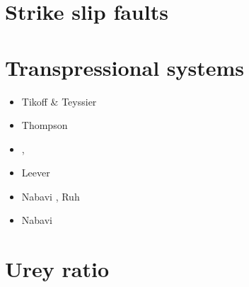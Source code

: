 \section{Strike slip faults} 


\textcite{tusp74}







\section{Transpressional systems} 

\begin{scriptsize}
\begin{itemize}
\item[\nineteenninetyfour] Tikoff \& Teyssier \cite{tite94}
\item[\nineteenninetyseven] Thompson \etal \cite{thsj97}
\item[\twothousandthree] \textcite{konc03}, \textcite{upke03}
\item[\twothousandeleven] Leever \etal \cite{legs11}
\item[\twothousandseventeen] Nabavi \etal \cite{naam17}, Ruh \etal \cite{rugb17}
\item[\twothousandeighteen] Nabavi \etal \cite{naam18}
\end{itemize}
\end{scriptsize}

\section{Urey ratio}

